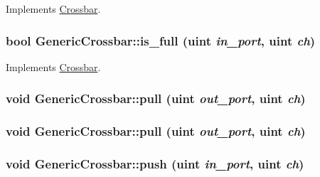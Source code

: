 Implements \hyperlink{classCrossbar_350fd72418bcb525209ae9e10c834468}{Crossbar}.\hypertarget{classGenericCrossbar_1949b9db3b5b1950ad6a2c9e46103024}{
\subsubsection[{is\_\-full}]{\setlength{\rightskip}{0pt plus 5cm}bool GenericCrossbar::is\_\-full ({\bf uint} {\em in\_\-port}, \/  {\bf uint} {\em ch})}}
\label{classGenericCrossbar_1949b9db3b5b1950ad6a2c9e46103024}




Implements \hyperlink{classCrossbar_350fd72418bcb525209ae9e10c834468}{Crossbar}.\hypertarget{classGenericCrossbar_3c3fa82ff5db189ec69497f79e15112c}{
\subsubsection[{pull}]{\setlength{\rightskip}{0pt plus 5cm}void GenericCrossbar::pull ({\bf uint} {\em out\_\-port}, \/  {\bf uint} {\em ch})}}
\label{classGenericCrossbar_3c3fa82ff5db189ec69497f79e15112c}


\hypertarget{classGenericCrossbar_3c3fa82ff5db189ec69497f79e15112c}{
\subsubsection[{pull}]{\setlength{\rightskip}{0pt plus 5cm}void GenericCrossbar::pull ({\bf uint} {\em out\_\-port}, \/  {\bf uint} {\em ch})}}
\label{classGenericCrossbar_3c3fa82ff5db189ec69497f79e15112c}


\hypertarget{classGenericCrossbar_d925d4a2c3b5b4585e087dc423eeb0b8}{
\subsubsection[{push}]{\setlength{\rightskip}{0pt plus 5cm}void GenericCrossbar::push ({\bf uint} {\em in\_\-port}, \/  {\bf uint} {\em ch})}}
\label{classGenericCrossbar_d925d4a2c3b5b4585e087dc423eeb0b8}


